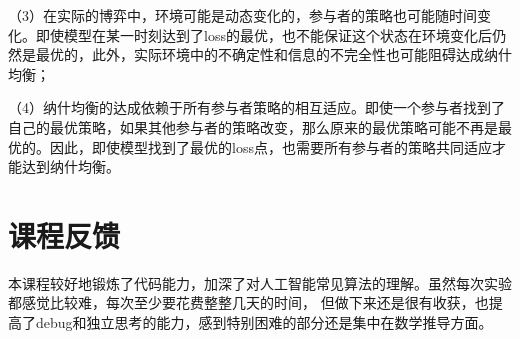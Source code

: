 \documentclass{ctexart}
\begin{document}
（3）在实际的博弈中，环境可能是动态变化的，参与者的策略也可能随时间变化。即使模型在某一时刻达到了loss的最优，也不能保证这个状态在环境变化后仍然是最优的，此外，实际环境中的不确定性和信息的不完全性也可能阻碍达成纳什均衡；

（4）纳什均衡的达成依赖于所有参与者策略的相互适应。即使一个参与者找到了自己的最优策略，如果其他参与者的策略改变，那么原来的最优策略可能不再是最优的。因此，即使模型找到了最优的loss点，也需要所有参与者的策略共同适应才能达到纳什均衡。
	\section{课程反馈}

本课程较好地锻炼了代码能力，加深了对人工智能常见算法的理解。虽然每次实验都感觉比较难，每次至少要花费整整几天的时间，
但做下来还是很有收获，也提高了debug和独立思考的能力，感到特别困难的部分还是集中在数学推导方面。

	
\end{document}
